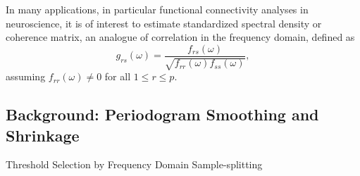 In many applications, in particular functional connectivity analyses in neuroscience, it is of interest to estimate standardized spectral density or coherence matrix, an analogue of correlation in the frequency domain,  defined as 
\begin{equation}
\label{def:coherance}
g_{rs}(\omega) = \frac{f_{rs}(\omega)}{\sqrt{f_{rr}(\omega)f_{ss}(\omega)}},
\end{equation}
assuming $f_{rr}(\omega) \neq 0$ for all $1\le r\le p$. 


\subsection{Background: Periodogram Smoothing and Shrinkage}\label{sec:model_method_background}


\begin{algorithm2e}[t]\small
	\DontPrintSemicolon 
	\caption{Threshold Selection by Frequency Domain Sample-splitting}
	\label{alg:sample-split}
	\label{al1}
\end{algorithm2e}

